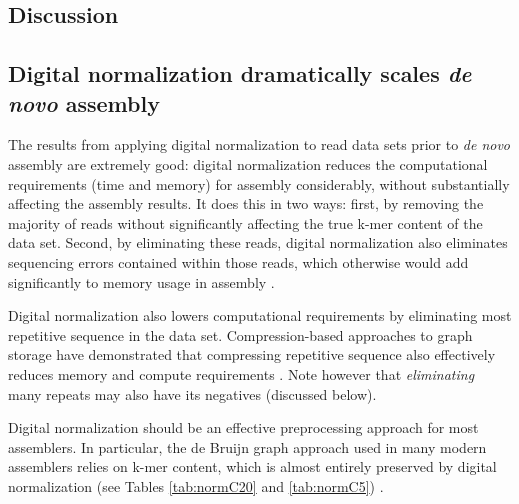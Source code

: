 \documentclass{pnastwo}
\begin{document}
\begin{article}
\section{Discussion}

\subsection{Digital normalization dramatically scales {\em de novo} assembly}

The results from applying digital normalization to read data sets
prior to {\em de novo} assembly are extremely good: digital
normalization reduces the computational requirements (time and memory)
for assembly considerably, without substantially affecting the
assembly results.  It does this in two ways: first, by removing
the majority of reads without significantly affecting the true k-mer
content of the data set. Second, by eliminating these reads,
digital normalization also eliminates sequencing errors contained
within those reads, which otherwise would add significantly to memory
usage in assembly \cite{pubmed21245053}.

Digital normalization also lowers computational requirements by
eliminating most repetitive sequence in the data set.
Compression-based approaches to graph storage have demonstrated that
compressing repetitive sequence also effectively reduces memory and
compute requirements \cite{pubmed22139935,pubmed22156294}.  Note
however that {\em eliminating} many repeats may also have its
negatives (discussed below).

Digital normalization should be an effective preprocessing approach
for most assemblers.  In particular, the de Bruijn graph approach used
in many modern assemblers relies on k-mer content, which is almost
entirely preserved by digital normalization (see Tables \ref{tab:normC20}
and \ref{tab:normC5}) \cite{pubmed20211242}.




\end{article}
\end{document}
